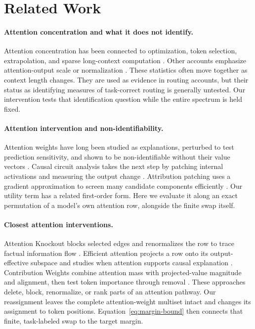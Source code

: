 \documentclass[letterpaper]{article} %
\begin{document}
\section{Related Work}

\paragraph{Attention concentration and what it does not identify.}
Attention concentration has been connected to optimization, token selection, extrapolation, and sparse
long-context computation \citep{maxmarginselection,nopeentropy,ssmax,sparselong}. Other accounts emphasize
attention-output scale or normalization \citep{vanishingvariance,postnorm}. These statistics often move
together as context length changes. They are used as evidence in routing accounts, but their status as
identifying measures of task-correct routing is generally untested. Our intervention tests that identification
question while the entire spectrum is held fixed.

\paragraph{Attention intervention and non-identifiability.}
Attention weights have long been studied as explanations, perturbed to test prediction sensitivity, and
shown to be non-identifiable without their value vectors
\citep{jainwallace2019,wiegreffepinter2019,brunner2020identifiability,kobayashi2020weight,hassid2022papa}.
Causal circuit analysis takes the next step by patching internal activations and measuring the output change
\citep{yamakoshi2023causal,conmy2023acdc}. Attribution patching uses a gradient approximation to screen many
candidate components efficiently \citep{syed2023attribution,kramar2024atp}. Our utility term has a related
first-order form. Here we evaluate it along an exact permutation of a model's own attention row, alongside the
finite swap itself.

\paragraph{Closest attention interventions.}
Attention Knockout blocks selected edges and renormalizes the row to trace factual information flow
\citep{geva2023dissecting}. Efficient attention projects a row onto its output-effective subspace and studies
when attention supports causal explanation \citep{naim2024explaining}. Contribution Weights combine attention
mass with projected-value magnitude and alignment, then test token importance through removal
\citep{cunningham2026contribution}. These approaches delete, block, renormalize, or rank parts of an attention
pathway. Our reassignment leaves the complete attention-weight multiset intact and changes its assignment to
token positions. Equation~\ref{eq:margin-bound} then connects that finite, task-labeled swap to the target margin.
\end{document}
